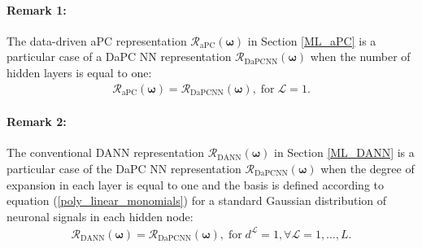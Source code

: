 \documentclass[a4paper,fleqn]{article}
\begin{document}
\paragraph{Remark 1:} The data-driven aPC representation $\mathcal{R}_\mathrm{aPC}(\bm{\omega})$ in Section \ref{ML_aPC} is a particular case of a DaPC NN representation $\mathcal{R}_\mathrm{DaPCNN}(\bm{\omega})$ when the number of hidden layers is equal to one:
%
\begin{eqnarray}
\label{DaPC_aPC_link}
\mathcal{R}_\mathrm{aPC}(\bm{\omega})=\mathcal{R}_\mathrm{DaPC NN}(\bm{\omega}), \; \mathrm{for} \; \mathcal{L}=1. 
\end{eqnarray}
%

\paragraph{Remark 2:} The conventional DANN representation $\mathcal{R}_\mathrm{DANN}(\bm{\omega})$ in Section \ref{ML_DANN} is a particular case of the DaPC NN representation $\mathcal{R}_\mathrm{DaPCNN}(\bm{\omega})$ when the degree of expansion in each layer is equal to one and the basis is defined according to equation (\ref{poly_linear_monomials}) for a standard Gaussian distribution of neuronal signals in each hidden node: 
%
\begin{eqnarray}
\label{DaPC_aPC_link}
\mathcal{R}_\mathrm{DANN}(\bm{\omega})=\mathcal{R}_\mathrm{DaPC NN}(\bm{\omega}), \; \mathrm{for} \; d^\mathcal{L}=1, \forall\mathcal{L}=1,\ldots,L.
\end{eqnarray}
%
\end{document}

